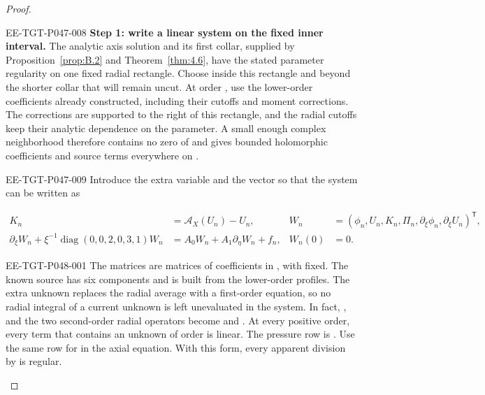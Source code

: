 \begin{proof}
\begin{EESegment}{EE-TGT-P047-008}
\textbf{Step 1: write a linear system on the fixed inner interval.} The analytic axis solution and
its first collar, supplied by Proposition~\ref{prop:B.2} and Theorem~\ref{thm:4.6}, have the stated
parameter regularity on one fixed radial rectangle. Choose  inside this
rectangle and beyond the shorter collar that will remain uncut. At order
, use the lower-order coefficients already constructed, including their
cutoffs and moment corrections. The corrections are supported to the right of this rectangle, and
the radial cutoffs keep their analytic dependence on the parameter. A small enough complex
neighborhood  therefore contains no zero of
 and gives bounded holomorphic coefficients and source terms everywhere on
.
\end{EESegment}

\begin{EESegment}{EE-TGT-P047-009}
Introduce the extra variable  and the vector
 so that the system can be written as
\end{EESegment}
\begin{equation}
\label{eq:5.7}
\begin{aligned}
K_n&=\mathcal A_X(U_n)-U_n,
&W_n&=(\phi_n,U_n,K_n,\Pi_n,\partial_\xi\phi_n,\partial_\xi U_n)^{\mathsf T},\\
\partial_\xi W_n+\xi^{-1}\operatorname{diag}(0,0,2,0,3,1)W_n
&=A_0W_n+A_1\partial_\eta W_n+f_n,
&W_n(0)&=0.
\end{aligned}
\tag{5.7}
\end{equation}
%
\begin{EESegment}{EE-TGT-P048-001}
The matrices  are
 matrices of coefficients in
, with  fixed. The known source
 has six components and is built from the lower-order profiles. The
extra unknown  replaces the radial average with a first-order equation,
so no radial integral of a current unknown is left unevaluated in the system. In fact,
, and the two second-order radial
operators become  and
. At every positive order, every
term that contains an unknown of order  is linear. The pressure row is
. Use the same row for
 in the axial equation. With this form, every apparent
division by  is regular.
\end{EESegment}


\end{proof}
